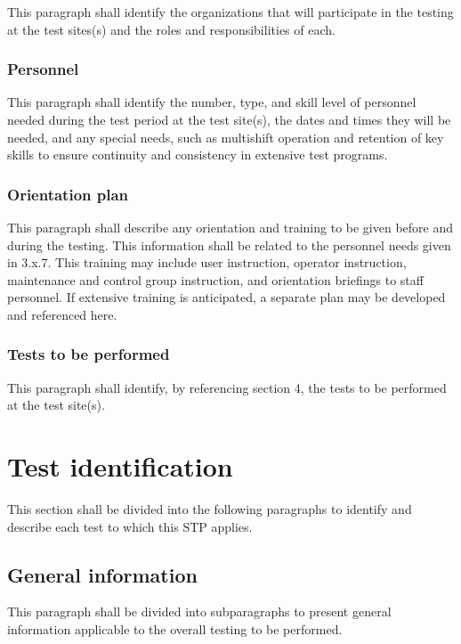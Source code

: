 \documentclass{fidata-report-template}
\begin{document}
This paragraph shall identify the organizations that will participate in
the testing at the test sites(s) and the roles and responsibilities of
each.

\subsubsection{Personnel}

This paragraph shall identify the number, type, and skill level of
personnel needed during the test period at the test site(s), the dates
and times they will be needed, and any special needs, such as multishift
operation and retention of key skills to ensure continuity and
consistency in extensive test programs.

\subsubsection{Orientation plan}

This paragraph shall describe any orientation and training to be given
before and during the testing. This information shall be related to the
personnel needs given in 3.x.7. This training may include user
instruction, operator instruction, maintenance and control group
instruction, and orientation briefings to staff personnel. If extensive
training is anticipated, a separate plan may be developed and referenced
here.

\subsubsection{Tests to be performed}

This paragraph shall identify, by referencing section 4, the tests to be
performed at the test site(s).

\section{Test identification}

This section shall be divided into the following paragraphs to identify
and describe each test to which this STP applies.

\subsection{General information}

This paragraph shall be divided into subparagraphs to present general
information applicable to the overall testing to be performed.
\end{document}
